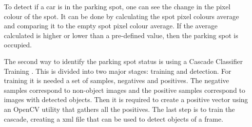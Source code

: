 
To detect if a car is in the parking spot, one can see the change in the pixel colour of the spot. It can be done by calculating the spot pixel colours average and comparing it to the empty spot pixel colour average. If the average calculated is higher or lower than a pre-defined value, then the parking spot is occupied.


The second way to identify the parking spot status is using a Cascade Classifier Training \cite{cascade}. This is divided into two major stages: training and detection. For training it is needed a set of samples, negatives and positives. The negative samples correspond to non-object images and the positive samples correspond to images with detected objects. Then it is required to create a positive vector using an OpenCV utility that gathers all the positives. The last step is to train the cascade, creating a \ac{xml} file that can be used to detect objects of a frame.

